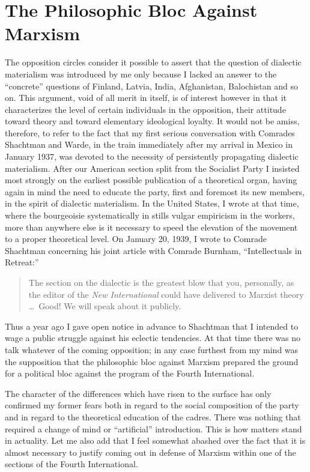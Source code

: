 \section*{The Philosophic Bloc Against Marxism}

The opposition circles consider it possible to assert that the question of dialectic materialism was introduced by me only because I lacked an answer to the “concrete” questions of Finland, Latvia, India, Afghanistan, Balochistan and so on. This argument, void of all merit in itself, is of interest however in that it characterizes the level of certain individuals in the opposition, their attitude toward theory and toward elementary ideological loyalty. It would not be amiss, therefore, to refer to the fact that my first serious conversation with Comrades Shachtman and Warde, in the train immediately after my arrival in Mexico in January 1937, was devoted to the necessity of persistently propagating dialectic materialism. After our American section split from the Socialist Party I insisted most strongly on the earliest possible publication of a theoretical organ, having again in mind the need to educate the party, first and foremost its new members, in the spirit of dialectic materialism. In the United States, I wrote at that time, where the bourgeoisie systematically in stills vulgar empiricism in the workers, more than anywhere else is it necessary to speed the elevation of the movement to a proper theoretical level. On January 20, 1939, I wrote to Comrade Shachtman concerning his joint article with Comrade Burnham, ``Intellectuals in Retreat:''

\begin{quote}
  The section on the dialectic is the greatest blow that you, personally, as the editor of the \emph{New International} could have delivered to Marxist theory \dots\ Good! We will speak about it publicly.
\end{quote}

Thus a year ago I gave open notice in advance to Shachtman that I intended to wage a public struggle against his eclectic tendencies. At that time there was no talk whatever of the coming opposition; in any case furthest from my mind was the supposition that the philosophic bloc against Marxism prepared the ground for a political bloc against the program of the Fourth International.

The character of the differences which have risen to the surface has only confirmed my former fears both in regard to the social composition of the party and in regard to the theoretical education of the cadres. There was nothing that required a change of mind or “artificial” introduction. This is how matters stand in actuality. Let me also add that I feel somewhat abashed over the fact that it is almost necessary to justify coming out in defense of Marxism within one of the sections of the Fourth International.

